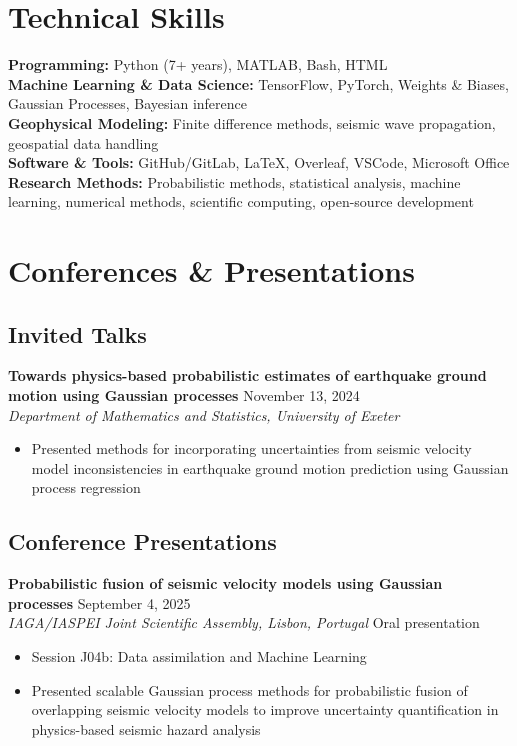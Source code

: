 \documentclass[11pt,a4paper]{article}
\newcommand{\cventry}[4]{%
    \noindent\textbf{#1} \hfill #2\\
    \textit{#3} \hfill #4\\[0.1em]
}
\begin{document}
\section*{Technical Skills}

\textbf{Programming:} Python (7+ years), MATLAB, Bash, HTML\\
\textbf{Machine Learning \& Data Science:} TensorFlow, PyTorch, Weights \& Biases, Gaussian Processes, Bayesian inference\\
\textbf{Geophysical Modeling:} Finite difference methods, seismic wave propagation, geospatial data handling\\
\textbf{Software \& Tools:} GitHub/GitLab, LaTeX, Overleaf, VSCode, Microsoft Office\\
\textbf{Research Methods:} Probabilistic methods, statistical analysis, machine learning, numerical methods, scientific computing, open-source development

\section*{Conferences \& Presentations}

\subsection*{Invited Talks}
\cventry{Towards physics-based probabilistic estimates of earthquake ground motion using Gaussian processes}{November 13, 2024}{Department of Mathematics and Statistics, University of Exeter}{}
\begin{itemize}
    \item Presented methods for incorporating uncertainties from seismic velocity model inconsistencies in earthquake ground motion prediction using Gaussian process regression
\end{itemize}

\subsection*{Conference Presentations}
\cventry{Probabilistic fusion of seismic velocity models using Gaussian processes}{September 4, 2025}{IAGA/IASPEI Joint Scientific Assembly, Lisbon, Portugal}{Oral presentation}
\begin{itemize}
    \item Session J04b: Data assimilation and Machine Learning
    \item Presented scalable Gaussian process methods for probabilistic fusion of overlapping seismic velocity models to improve uncertainty quantification in physics-based seismic hazard analysis
\end{itemize}
\end{document}
